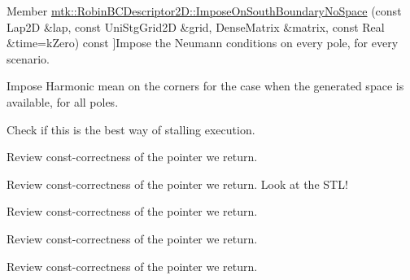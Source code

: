 \begin{DoxyRefList}
\hypertarget{todo__todo000027}{}%
Member \hyperlink{classmtk_1_1RobinBCDescriptor2D_a82159bcca93555114532c5fa4d0fb3db}{mtk\+:\+:Robin\+B\+C\+Descriptor2\+D\+:\+:Impose\+On\+South\+Boundary\+No\+Space} (const Lap2\+D \&lap, const Uni\+Stg\+Grid2\+D \&grid, Dense\+Matrix \&matrix, const Real \&time=k\+Zero) const ]Impose the Neumann conditions on every pole, for every scenario.  
\item[\label{todo__todo000028}%
\hypertarget{todo__todo000028}{}%
Member \hyperlink{classmtk_1_1RobinBCDescriptor2D_a2f99cdd8bda2bc46cf259bb96ef4bd49}{mtk\+:\+:Robin\+B\+C\+Descriptor2\+D\+:\+:Impose\+On\+South\+Boundary\+With\+Space} (const Lap2\+D \&lap, const Uni\+Stg\+Grid2\+D \&grid, Dense\+Matrix \&matrix, const Real \&time=k\+Zero) const ]Impose Harmonic mean on the corners for the case when the generated space is available, for all poles.  
\item[\label{todo__todo000030}%
\hypertarget{todo__todo000030}{}%
Member \hyperlink{classmtk_1_1Tools_a332324c6f25e66be9dff48c5987a3b9f}{mtk\+:\+:Tools\+:\+:Prevent} (const bool complement, const char $\ast$const fname, int lineno, const char $\ast$const fxname) noexcept]Check if this is the best way of stalling execution.  
\item[\label{todo__todo000006}%
\hypertarget{todo__todo000006}{}%
Member \hyperlink{classmtk_1_1UniStgGrid1D_aa1999580cb98c19950e951510871cc90}{mtk\+:\+:Uni\+Stg\+Grid1\+D\+:\+:discrete\+\_\+domain\+\_\+x} () const ]Review const-\/correctness of the pointer we return.  
\item[\label{todo__todo000007}%
\hypertarget{todo__todo000007}{}%
Member \hyperlink{classmtk_1_1UniStgGrid1D_ab9c3f9ee2ac76a351b01e4abfede4d19}{mtk\+:\+:Uni\+Stg\+Grid1\+D\+:\+:discrete\+\_\+field} ()]Review const-\/correctness of the pointer we return. Look at the S\+T\+L!  
\item[\label{todo__todo000009}%
\hypertarget{todo__todo000009}{}%
Member \hyperlink{classmtk_1_1UniStgGrid2D_ab2f70cf5cd0a2d5486992d9f2f8baa4a}{mtk\+:\+:Uni\+Stg\+Grid2\+D\+:\+:discrete\+\_\+domain\+\_\+x} () const ]Review const-\/correctness of the pointer we return.  
\item[\label{todo__todo000010}%
\hypertarget{todo__todo000010}{}%
Member \hyperlink{classmtk_1_1UniStgGrid2D_ac33a58d65105550dcf6f6b92b48b5105}{mtk\+:\+:Uni\+Stg\+Grid2\+D\+:\+:discrete\+\_\+domain\+\_\+y} () const ]Review const-\/correctness of the pointer we return.  
\item[\label{todo__todo000012}%
\hypertarget{todo__todo000012}{}%
Member \hyperlink{classmtk_1_1UniStgGrid3D_a2365ddd57304c4036a07844b952b31ad}{mtk\+:\+:Uni\+Stg\+Grid3\+D\+:\+:discrete\+\_\+domain\+\_\+x} () const ]Review const-\/correctness of the pointer we return.  

\end{DoxyRefList}
